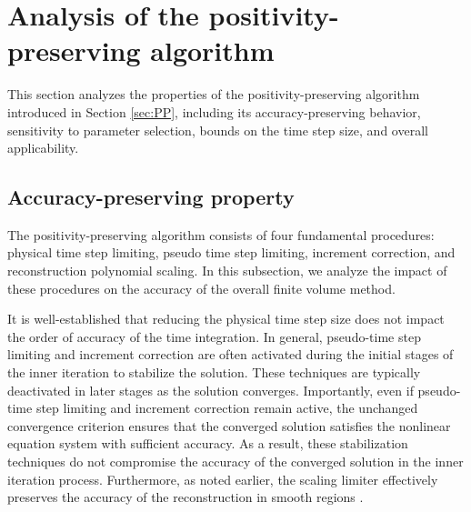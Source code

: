 
\section{Analysis of the positivity-preserving algorithm}

This section analyzes the properties of the positivity-preserving algorithm introduced in Section \ref{sec:PP}, including its accuracy-preserving behavior, sensitivity to parameter selection, bounds on the time step size, and overall applicability.

\subsection{Accuracy-preserving property}

The positivity-preserving algorithm consists of four fundamental procedures: physical time step limiting, pseudo time step limiting, increment correction, and reconstruction polynomial scaling. In this subsection, we analyze the impact of these procedures on the accuracy of the overall finite volume method.

It is well-established that reducing the physical time step size does not impact the order of accuracy of the time integration.
In general, pseudo-time step limiting and increment correction are often activated during the initial stages of the inner iteration to stabilize the solution. These techniques are typically deactivated in later stages as the solution converges. Importantly, even if pseudo-time step limiting and increment correction remain active, the unchanged convergence criterion ensures that the converged solution satisfies the nonlinear equation system with sufficient accuracy. As a result, these stabilization techniques do not compromise the accuracy of the converged solution in the inner iteration process.
Furthermore, as noted earlier, the scaling limiter effectively preserves the accuracy of the reconstruction in smooth regions \cite{zhang2010positivity}.

